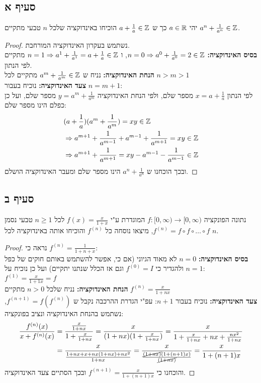 \documentclass{article}
\begin{document}
	\subsection*{סעיף א}
	יהי $a \in \mathbb{R}$ כך ש $a + \frac{1}{a} \in \mathbb{Z}$ הוכיחו באינדוקציה שלכל $n$ טבעי
	מתקיים $a^n + \frac{1}{a^n} \in \mathbb{Z}$.
	\begin{proof}
		נשתמש בעקרון האינדוקציה המורחבת. \\
		\textbf{בסיס האינדוקציה:} $n=0 \Rightarrow a^0 + \frac{1}{a^0} = 2 \in \mathbb{Z}$, ו
		$n=1 \Rightarrow a^1 + \frac{1}{a^1} = a + \frac{1}{a} \in \mathbb{Z}$ מתקיים לפי הנתון. \\
		\textbf{הנחת האינדוקציה:} נניח ש $a^m + \frac{1}{a^m} \in \mathbb{Z}$ מתקיים לכל $n > m > 1$ \\
		\textbf{צעד האינדוקציה:} נוכיח בעבור $n = m+1$: \\
		לפי הנתון $x = a + \frac{1}{a}$ מספר שלם, ולפי הנחת האינדוקציה $y = a^m + \frac{1}{a^m}$ מספר שלם, ועל כן כפלם הינו מספר שלם:
		\begin{align*}
			&(a + \frac{1}{a})(a^m + \frac{1}{a^m}) = xy \in \mathbb{Z}  \\
			&\Rightarrow
			a^{m+1} + \frac{1}{a^{m-1}} + a^{m-1} + \frac{1}{a^{m+1}} = xy \in \mathbb{Z} \\
			&\Rightarrow
			a^{m+1} + \frac{1}{a^{m+1}} = xy - a^{m-1} - \frac{1}{a^{m-1}} \in \mathbb{Z}
		\end{align*}
		ובכך הוכחנו ש $a^{n} + \frac{1}{a^{n}}$ הינו מספר שלם ומעבר האינדוקציה הושלם.
	\end{proof}

	\subsection*{סעיף ב}
	נתונה הפונקציה $f: [0, \infty) \to [0, \infty)$ המוגדרת ע"י $f(x) = \frac{x}{1+x}$
	לכל $n \geq 1$ טבעי נסמן $f^{(n)}= f \circ f \circ \dots \circ f$,
	מיצאו נוסחה כל $f^{(n)}$ והוכיחו אותה באינדוקציה לכל $n$.
	\begin{proof}
		נראה כי $f^{(n)} = \frac{1}{1 + n+x}$: \\
		\textbf{בסיס האינדוקציה:} $n=0$ לא מאוד הגיוני (אם כי, אפשר להשתמש באותם חוקים של כפל ולהגדיר כי $f^{(0)}=I$ וגם אז הכלל שנתנו יתקיים) ועל כן נוכיח על $n=1$:
		$f^{(1)} = \frac{x}{1+1x} = f$ \\
		\textbf{הנחת האינדוקציה:} נניח שלכל $n > 0$ מתקיים $f^{(n)} = \frac{x}{1 + nx}$ \\
		\textbf{צעד האינדוקציה:} נוכיח בעבור $n+1$:
		עפ"י הגדרת ההרכבה נקבל ש $f^{(n+1)} = f(f^{(n)})$, נשתמש בהנחת האינדוקציה ונציב בפונקציה:
		\begin{align*}
			\frac{f^{(n)}(x)}{x + f^{(n)}(x)} &=
			\frac{\frac{x}{1+nx}}{1+\frac{x}{1+nx}} =
			\frac{x}{(1+nx)(1 + \frac{x}{1 + nx})} =
			\frac{x}{1 + \frac{x}{1+nx} + nx + \frac{nx^2}{1+nx}} \\
			&= \frac{x}{\frac{1 + nx + x + nx(1+nx) + nx^2}{1+nx}} =
			\frac{x}{\frac{\cancel{(1+nx)}(1+(n+1)x)}{\cancel{(1+nx)}}}
			= \frac{x}{1 + (n+1)x}
		\end{align*}
		והוכחנו כי $f^{(n+1)} = \frac{x}{1+(n+1)x}$ ובכך הסתיים צעד האינדוקציה.
	\end{proof}
\end{document}
